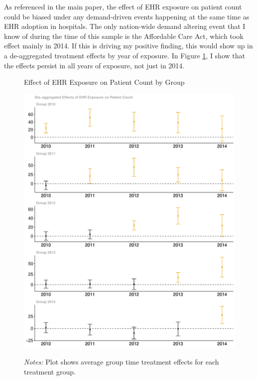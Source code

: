 \documentclass[12pt]{article}
\begin{document}
As referenced in the main paper, the effect of EHR exposure on patient count could be biased under any demand-driven events happening at the same time as EHR adoption in hospitals. The only nation-wide demand altering event that I know of during the time of this sample is the Affordable Care Act, which took effect mainly in 2014. If this is driving my positive finding, this would show up in a de-aggregated treatment effects by year of exposure. In Figure \ref{fig:patientgroup}, I show that the effects persist in all years of exposure, not just in 2014. 

\begin{figure}[ht!]
    \centering
    \captionsetup{width=.6\linewidth}
    \caption{Effect of EHR Exposure on Patient Count by Group}
    \includegraphics[scale=.4]{Objects/patient_group.pdf}
    \label{fig:patientgroup}
    \vspace{2mm}
    \caption*{\footnotesize{\textit{Notes:} Plot shows average group time treatment effects for each treatment group.}}
\end{figure}
\end{document}
